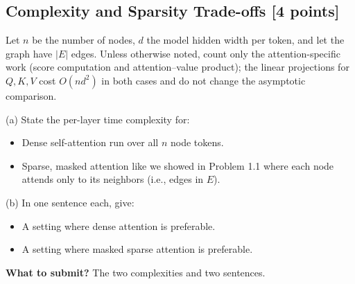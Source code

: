 \subsection{Complexity and Sparsity Trade-offs [4 points]}
Let $n$ be the number of nodes, $d$ the model hidden width per token, and let the graph have $|E|$ edges. Unless otherwise noted, count only the attention-specific work (score computation and attention–value product); the linear projections for $Q,K,V$ cost $O(nd^2)$ in both cases and do not change the asymptotic comparison.


(a) State the per-layer time complexity for:
\begin{itemize}
  \item Dense self-attention run over all $n$ node tokens.
  \item Sparse, masked attention like we showed in Problem 1.1 where each node attends only to its neighbors (i.e., edges in $E$).
\end{itemize}

(b) In one sentence each, give:
\begin{itemize}
  \item A setting where dense attention is preferable.
  \item A setting where masked sparse attention is preferable.
\end{itemize}

\textbf{What to submit?} The two complexities and two sentences.

\Solution{
}
